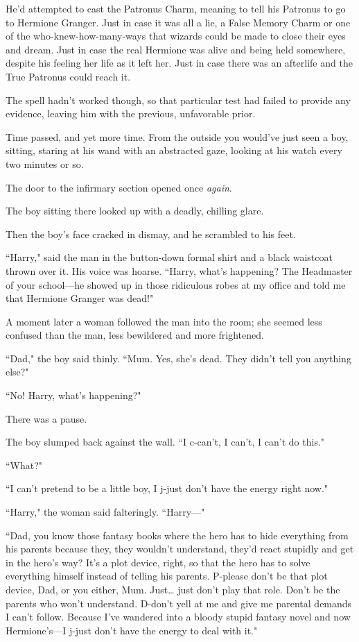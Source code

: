He'd attempted to cast the Patronus Charm, meaning to tell his Patronus to go to Hermione Granger. Just in case it was all a lie, a False Memory Charm or one of the who-knew-how-many-ways that wizards could be made to close their eyes and dream. Just in case the real Hermione was alive and being held somewhere, despite his feeling her life as it left her. Just in case there was an afterlife and the True Patronus could reach it.

The spell hadn't worked though, so that particular test had failed to provide any evidence, leaving him with the previous, unfavorable prior.

Time passed, and yet more time. From the outside you would've just seen a boy, sitting, staring at his wand with an abstracted gaze, looking at his watch every two minutes or so.

The door to the infirmary section opened once \emph{again}.

The boy sitting there looked up with a deadly, chilling glare.

Then the boy's face cracked in dismay, and he scrambled to his feet.

``Harry," said the man in the button-down formal shirt and a black waistcoat thrown over it. His voice was hoarse. ``Harry, what's happening? The Headmaster of your school—he showed up in those ridiculous robes at my office and told me that Hermione Granger was dead!"

A moment later a woman followed the man into the room; she seemed less confused than the man, less bewildered and more frightened.

``Dad," the boy said thinly. ``Mum. Yes, she's dead. They didn't tell you anything else?"

``No! Harry, what's happening?"

There was a pause.

The boy slumped back against the wall. ``I c-can't, I can't, I can't do this."

``What?"

``I can't pretend to be a little boy, I j-just don't have the energy right now."

``Harry," the woman said falteringly. ``Harry—"

``Dad, you know those fantasy books where the hero has to hide everything from his parents because they, they wouldn't understand, they'd react stupidly and get in the hero's way? It's a plot device, right, so that the hero has to solve everything himself instead of telling his parents. P-please don't be that plot device, Dad, or you either, Mum. Just{\ldots} just don't play that role. Don't be the parents who won't understand. D-don't yell at me and give me parental demands I can't follow. Because I've wandered into a bloody stupid fantasy novel and now Hermione's—I j-just don't have the energy to deal with it."

